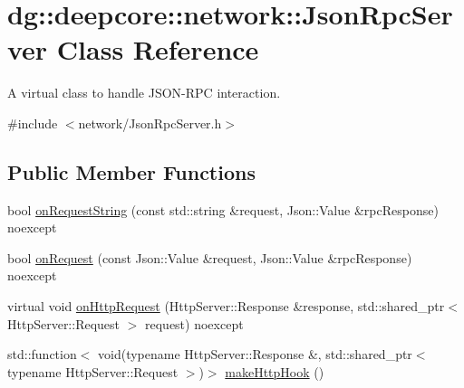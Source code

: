 \hypertarget{classdg_1_1deepcore_1_1network_1_1_json_rpc_server}{}\section{dg\+:\+:deepcore\+:\+:network\+:\+:Json\+Rpc\+Server Class Reference}
\label{classdg_1_1deepcore_1_1network_1_1_json_rpc_server}


A virtual class to handle J\+S\+O\+N-\/\+R\+PC interaction.  




{\ttfamily \#include $<$network/\+Json\+Rpc\+Server.\+h$>$}

\subsection*{Public Member Functions}
\begin{DoxyCompactItemize}
\item 
bool \hyperlink{classdg_1_1deepcore_1_1network_1_1_json_rpc_server_afdf48f480c38c0323ede59f0a4f34a46}{on\+Request\+String} (const std\+::string \&request, Json\+::\+Value \&rpc\+Response) noexcept
\item 
bool \hyperlink{classdg_1_1deepcore_1_1network_1_1_json_rpc_server_a1223e51df1a94dbfc4f191a6d40bf7b8}{on\+Request} (const Json\+::\+Value \&request, Json\+::\+Value \&rpc\+Response) noexcept
\item 
virtual void \hyperlink{classdg_1_1deepcore_1_1network_1_1_json_rpc_server_a1cd378978887971fb20ae14b09b08d2c}{on\+Http\+Request} (Http\+Server\+::\+Response \&response, std\+::shared\+\_\+ptr$<$ Http\+Server\+::\+Request $>$ request) noexcept
\item 
std\+::function$<$ void(typename Http\+Server\+::\+Response \&, std\+::shared\+\_\+ptr$<$ typename Http\+Server\+::\+Request $>$)$>$ \hyperlink{classdg_1_1deepcore_1_1network_1_1_json_rpc_server_a9066e03b8dd9ef6e781447e6fbf90a78}{make\+Http\+Hook} ()
\end{DoxyCompactItemize}
